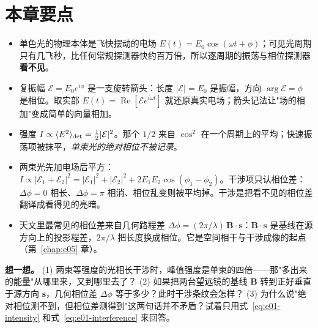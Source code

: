 \section{本章要点}
\label{sec:e01-summary}

\begin{itemize}
  \item 单色光的物理本体是飞快摆动的电场 \(E(t)=E_0\cos(\omega t+\phi)\)；可见光周期只有几飞秒，比任何常规探测器快约百万倍，所以逐周期的振荡与相位探测器\textbf{看不见}。
  \item 复振幅 \(\mathcal E=E_0e^{i\phi}\) 是一支旋转箭头：长度 \(|\mathcal E|=E_0\) 是振幅，方向 \(\arg\mathcal E=\phi\) 是相位。取实部 \(E(t)=\operatorname{Re}[\mathcal E e^{i\omega t}]\) 就还原真实电场；箭头记法让"场的相加"变成简单的向量相加。
  \item 强度 \(I\propto\langle E^2\rangle_{\rm det}=\tfrac12|\mathcal E|^2\)。那个 \(1/2\) 来自 \(\cos^2\) 在一个周期上的平均；快速振荡项被抹平，\emph{单束光的绝对相位不被记录}。
  \item 两束光先加电场后平方：\(I\propto|\mathcal E_1+\mathcal E_2|^2=|\mathcal E_1|^2+|\mathcal E_2|^2+2E_1E_2\cos(\phi_1-\phi_2)\)。干涉项只认相位差：\(\Delta\phi=0\) 相长、\(\Delta\phi=\pi\) 相消、相位乱变则被平均掉。干涉是把看不见的相位差翻译成看得见的亮暗。
  \item 天文里最常见的相位差来自几何路程差 \(\Delta\phi=(2\pi/\lambda)\,\bm B\cdot\bm s\)：\(\bm B\cdot\bm s\) 是基线在源方向上的投影程差，\(2\pi/\lambda\) 把长度换成相位。它是空间相干与干涉成像的起点（第~\ref{chap:e05} 章）。
\end{itemize}

\vspace{0.5em}
\noindent\textbf{想一想。}
(1) 两束等强度的光相长干涉时，峰值强度是单束的四倍——那"多出来的能量"从哪里来，又到哪里去了？
(2) 如果把两台望远镜的基线 \(\bm B\) 转到正好垂直于源方向 \(\bm s\)，几何相位差 \(\Delta\phi\) 等于多少？此时干涉条纹会怎样？
(3) 为什么说"绝对相位测不到，但相位差测得到"这两句话并不矛盾？试着只用式~\eqref{eq:e01-intensity} 和式~\eqref{eq:e01-interference} 来回答。
